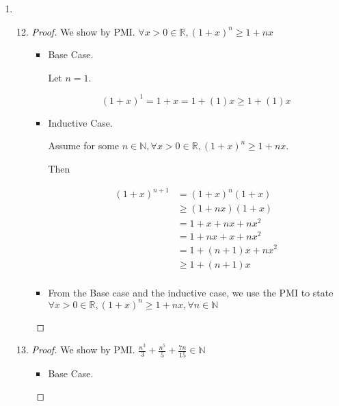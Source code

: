 \documentclass[12pt,letterpaper]{article}
\begin{document}
\begin{enumerate}
\begin{enumerate}
\begin{enumerate}
\begin{proof}
\begin{itemize}
                  \item
                    From the Base case and the inductive case,
                    we use the PMI to state $\prod\limits_{i = 1}^{n}(2i - 1) = \frac{\left(2n\right)!}{n! 2^n}, \forall n \in \mathbb{N}$
                \end{itemize}
              \end{proof}
          \end{enumerate}
        \item
          \begin{enumerate}
            \setcounter{enumiii}{11}
            \item
              \begin{proof}
                We show by PMI.
                $\forall x > 0 \in \mathbb{R}, \left(1 + x\right)^n \geq 1 + nx$
                \begin{itemize}
                  \item Base Case.

                    Let $n = 1$.

                    \[
                      \left(1 + x\right)^1 = 1 + x  = 1 + (1)x  \geq 1 + (1)x
                    \]
                  \item Inductive Case.

                    Assume for some $n \in \mathbb{N}, \forall x > 0 \in \mathbb{R}, \left(1 + x\right)^n \geq 1 + nx$.

                    Then

                    \begin{align*}
                      \left(1 + x\right)^{n + 1}
                      &= \left(1 + x\right)^n\left(1 + x\right) \\
                      &\geq \left(1 + nx\right)\left(1 + x\right) \\
                      &= 1 + x + nx + nx^2 \\
                      &= 1 + nx + x + nx^2 \\
                      &= 1 + (n + 1)x + nx^2 \\
                      &\geq 1 + (n + 1)x \\
                    \end{align*}

                  \item
                    From the Base case and the inductive case,
                    we use the PMI to state $\forall x > 0 \in \mathbb{R}, \left(1 + x\right)^n \geq 1 + nx, \forall n \in \mathbb{N}$
                \end{itemize}
              \end{proof}
            \item
              \begin{proof}
                We show by PMI.
                $\frac{n^3}{3} + \frac{n^5}{5} + \frac{7n}{15} \in \mathbb{N}$
                \begin{itemize}
                  \item Base Case.


\end{itemize}
\end{proof}
\end{enumerate}
\end{enumerate}
\end{enumerate}
\end{document}
